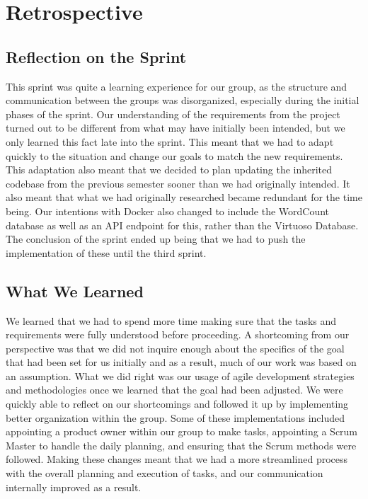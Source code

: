 \section{Retrospective}

\subsection{Reflection on the Sprint}
This sprint was quite a learning experience for our group, as the structure and communication between the \knox{} groups was disorganized, especially during the initial phases of the sprint. 
Our understanding of the requirements from the \knox{} project turned out to be different from what may have initially been intended, but we only learned this fact late into the sprint. 
This meant that we had to adapt quickly to the situation and change our goals to match the new requirements. 
This adaptation also meant that we decided to plan updating the inherited codebase from the previous semester sooner than we had originally intended. 
It also meant that what we had originally researched became redundant for the time being.
Our intentions with Docker also changed to include the WordCount database as well as an API endpoint for this, rather than the Virtuoso Database. 
The conclusion of the sprint ended up being that we had to push the implementation of these until the third sprint.

\subsection{What We Learned}
We learned that we had to spend more time making sure that the tasks and requirements were fully understood before proceeding. 
A shortcoming from our perspective was that we did not inquire enough about the specifics of the goal that had been set for us initially and as a result, much of our work was based on an assumption. 
What we did right was our usage of agile development strategies and methodologies once we learned that the goal had been adjusted. 
We were quickly able to reflect on our shortcomings and followed it up by implementing better organization within the group. 
Some of these implementations included appointing a product owner within our group to make tasks, appointing a Scrum Master to handle the daily planning, and ensuring that the Scrum methods were followed. 
Making these changes meant that we had a more streamlined process with the overall planning and execution of tasks, and our communication internally improved as a result.


